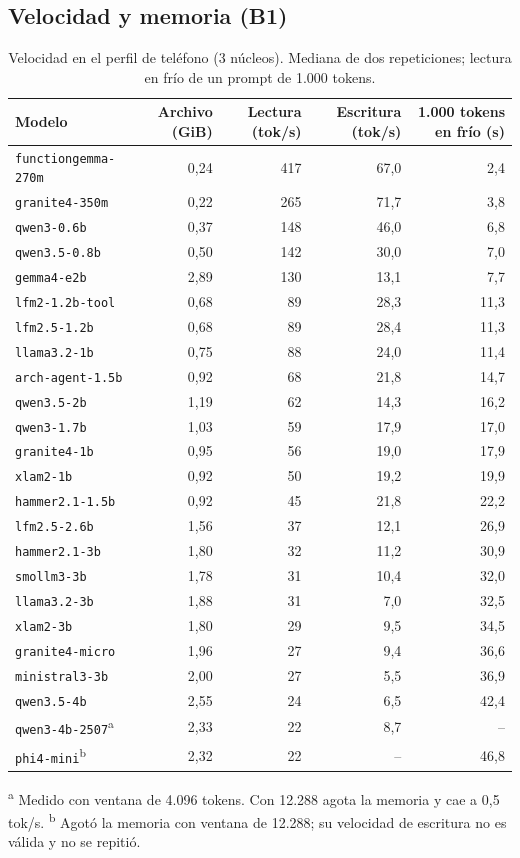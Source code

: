 \documentclass[11pt,a4paper]{article}
\newcommand{\m}[1]{\texttt{#1}}
\newcommand{\nd}{\textcolor{muted}{--}}
\begin{document}
\subsection{Velocidad y memoria (B1)}

\begin{table}[H]
\centering\small
\caption{Velocidad en el perfil de teléfono (3 núcleos). Mediana de dos repeticiones; lectura en frío de un prompt de 1.000 tokens.}\label{tab:speed}
\begin{tabularx}{\textwidth}{@{}lRRRR@{}}
\toprule
Modelo & Archivo (GiB) & Lectura (tok/s) & Escritura (tok/s) & 1.000 tokens en frío (s)\\
\midrule
\m{functiongemma-270m} & 0,24 & 417 & 67,0 & 2,4\\
\m{granite4-350m} & 0,22 & 265 & 71,7 & 3,8\\
\m{qwen3-0.6b} & 0,37 & 148 & 46,0 & 6,8\\
\m{qwen3.5-0.8b} & 0,50 & 142 & 30,0 & 7,0\\
\m{gemma4-e2b} & 2,89 & 130 & 13,1 & 7,7\\
\m{lfm2-1.2b-tool} & 0,68 & 89 & 28,3 & 11,3\\
\m{lfm2.5-1.2b} & 0,68 & 89 & 28,4 & 11,3\\
\m{llama3.2-1b} & 0,75 & 88 & 24,0 & 11,4\\
\m{arch-agent-1.5b} & 0,92 & 68 & 21,8 & 14,7\\
\m{qwen3.5-2b} & 1,19 & 62 & 14,3 & 16,2\\
\m{qwen3-1.7b} & 1,03 & 59 & 17,9 & 17,0\\
\m{granite4-1b} & 0,95 & 56 & 19,0 & 17,9\\
\m{xlam2-1b} & 0,92 & 50 & 19,2 & 19,9\\
\m{hammer2.1-1.5b} & 0,92 & 45 & 21,8 & 22,2\\
\m{lfm2.5-2.6b} & 1,56 & 37 & 12,1 & 26,9\\
\m{hammer2.1-3b} & 1,80 & 32 & 11,2 & 30,9\\
\m{smollm3-3b} & 1,78 & 31 & 10,4 & 32,0\\
\m{llama3.2-3b} & 1,88 & 31 & 7,0 & 32,5\\
\m{xlam2-3b} & 1,80 & 29 & 9,5 & 34,5\\
\m{granite4-micro} & 1,96 & 27 & 9,4 & 36,6\\
\m{ministral3-3b} & 2,00 & 27 & 5,5 & 36,9\\
\m{qwen3.5-4b} & 2,55 & 24 & 6,5 & 42,4\\
\m{qwen3-4b-2507}\textsuperscript{a} & 2,33 & 22 & 8,7 & \nd\\
\m{phi4-mini}\textsuperscript{b} & 2,32 & 22 & \nd & 46,8\\
\bottomrule
\end{tabularx}

\vspace{3pt}
\begin{minipage}{\textwidth}\footnotesize
\textsuperscript{a} Medido con ventana de 4.096 tokens. Con 12.288 agota la memoria y cae a 0,5\,tok/s.\quad
\textsuperscript{b} Agotó la memoria con ventana de 12.288; su velocidad de escritura no es válida y no se repitió.
\end{minipage}
\end{table}
\end{document}
